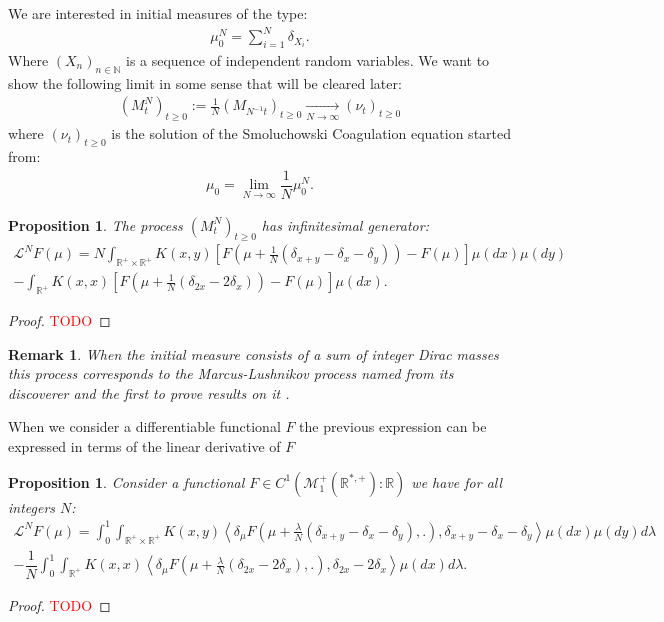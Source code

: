 \documentclass[11pt,a4paper]{article}
\newcommand{\RR}{\mathbb{R}}
\newcommand{\MC}{\mathcal{M}}
\newcommand{\LC}{\mathcal{L}}
\newcommand{\red}[1]{\textcolor{red}{#1}}
\newcommand{\Proc}[1]{\left(#1\right)_{t\geq 0}}
\newcommand{\Seq}[1]{\left(#1\right)_{n\in \mathbb{N}}}
\newtheorem{remark}[theorem]{Remark}
\newtheorem{proposition}[theorem]{Proposition}
\begin{document}
We are interested in initial measures of the type:
\begin{align*}
    \mu_0^N = \sum\limits_{i = 1}^N \delta_{X_i}.
\end{align*}
Where $\Seq{X_n}$ is a sequence of independent random variables. We want to show the following limit in some sense that will be cleared later:
\begin{align*}
   (M^N_t)_{t\ge 0} := \frac{1}{N} \Proc{M_{N^{-1}t}} \xrightarrow[N \to \infty]{} \Proc{\nu_t} 
\end{align*}
where $\Proc{\nu_t} $ is the solution of the Smoluchowski Coagulation equation started from:
\begin{align*}
    \mu_0 = \lim\limits_{N \to \infty} \dfrac{1}{N}\mu_0^N.
\end{align*}
\begin{proposition}
    The process $\Proc{M^N_{t}}$ has infinitesimal generator:
    \begin{multline*}
        \LC^N F(\mu) = N\int_{\RR^+ \times \RR^+} K(x,y)\left[ F\left(\mu + \frac{1}{N}\left(\delta_{x+y} - \delta_x - \delta_y\right) \right) - F(\mu) \right]\mu(dx)\mu(dy) \\
        -\int_{\RR^+} K(x,x)\left[ F\left(\mu + \frac{1}{N}\left(\delta_{2x} - 2\delta_x\right) \right) - F(\mu) \right]\mu(dx).
    \end{multline*}
\end{proposition}
\begin{proof}
    \red{TODO}
\end{proof}

\begin{remark}
    When the initial measure consists of a sum of integer Dirac masses this process corresponds to the Marcus-Lushnikov process named from its discoverer and the first to prove results on it \cite{marcus1968stochastic,lushnikov1978coagulation}. 
\end{remark}
When we consider a differentiable functional $F$ the previous expression can be expressed in terms of the linear derivative of $F$
\begin{proposition}\label{prop:SC_gen_differentiable}
    Consider a functional $F \in C^1(\MC_1^+\left(\RR^{*,+} \right):\RR)$ we have for all integers $N$:
    \begin{multline*}
        \LC^N F(\mu) = \int_0^1 \int_{\RR^+ \times \RR^+} K(x,y)\left\langle  \delta_\mu F\left(\mu + \frac{\lambda}{N}\left(\delta_{x + y} - \delta_x - \delta_y \right),.\right),\delta_{x+y} - \delta_x - \delta_y\right\rangle\mu(dx)\mu(dy)d\lambda \\
        -\dfrac{1}{N}\int_0^1\int_{\RR^+} K(x,x)\left\langle  \delta_\mu F\left(\mu + \frac{\lambda}{N}\left(\delta_{2x} - 2\delta_x \right),.\right),\delta_{2x} - 2\delta_x \right\rangle\mu(dx)d\lambda.
    \end{multline*}
\end{proposition}
\begin{proof}
    \red{TODO}
\end{proof}
\end{document}
